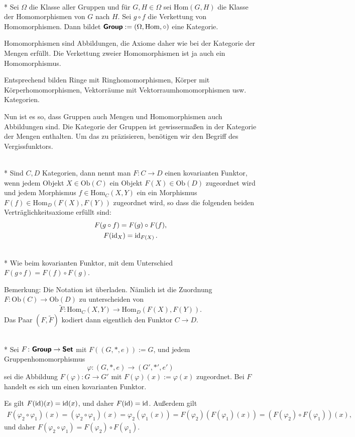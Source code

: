 \begin{Satz}\mbox{}\\*
Sei $\Omega$ die Klasse aller Gruppen und für $G,H\in\Omega$ sei
$\mathrm{Hom}(G,H)$ die Klasse der Homomorphismen von $G$ nach $H$.
Sei $g\circ f$ die Verkettung von Homomorphismen.
Dann bildet $\textsf{\textbf{Group}}:=(\Omega,\mathrm{Hom},\circ)$
eine Kategorie.
\end{Satz}
 Homomorphismen sind Abbildungen, die Axiome
daher wie bei der Kategorie der Mengen erfüllt. Die Verkettung
zweier Homomorphismen ist ja auch ein Homomorphismus.\;\qedsymbol

Entsprechend bilden Ringe mit Ringhomomorphismen, Körper mit
Körperhomomorphismen, Vektorräume mit Vektorraumhomomorphismen
usw. Kategorien.

Nun ist es so, dass Gruppen auch Mengen und Homomorphismen
auch Abbildungen sind. Die Kategorie der Gruppen ist gewissermaßen
in der Kategorie der Mengen enthalten. Um das zu präzisieren,
benötigen wir den Begriff des Vergissfunktors.

\begin{Definition}\mbox{}\\*
Sind $C,D$ Kategorien, dann nennt man $F\colon C\to D$ einen
kovarianten Funktor, wenn jedem Objekt $X\in\mathrm{Ob}(C)$ ein Objekt
$F(X)\in\mathrm{Ob}(D)$ zugeordnet wird und jedem Morphismus
$f\in\mathrm{Hom}_C(X,Y)$ ein ein Morphismus
$F(f)\in\mathrm{Hom}_D(F(X),F(Y))$ zugeordnet wird,
so dass die folgenden beiden Verträglichkeitsaxiome erfüllt sind:%
\begin{gather*}
F(g\circ f) = F(g)\circ F(f),\\
F(\operatorname{id}_X) = \operatorname{id}_{F(X)}.
\end{gather*}
\end{Definition}
\begin{Definition}\mbox{}\\*
Wie beim kovarianten Funktor, mit dem Unterschied
$F(g\circ f) = F(f)\circ F(g)$.
\end{Definition}
Bemerkung: Die Notation ist überladen. Nämlich ist die Zuordnung
$F\colon\mathrm{Ob}(C)\to\mathrm{Ob}(D)$ zu unterscheiden
von
\[\tilde F\colon\mathrm{Hom}_C(X,Y)\to\mathrm{Hom}_D(F(X),F(Y)).\]
Das Paar $(F,\tilde F)$ kodiert dann eigentlich den Funktor
$C\to D$.

\begin{Satz}[Vergissfunktor]\mbox{}\\*
Sei $F\colon\textsf{\textbf{Group}}\to\textsf{\textbf{Set}}$ mit $F((G,*,e)):=G$,
und jedem Gruppenhomomorphismus%
\[\varphi\colon (G,*,e)\to (G',*',e')\]
sei die Abbildung $F(\varphi)\colon G\to G'$ mit
$F(\varphi)(x):=\varphi(x)$ zugeordnet. Bei $F$ handelt
es sich um einen kovarianten Funktor.
\end{Satz}
Es gilt $F(\operatorname{id})(x) = \operatorname{id}(x)$, und daher $F(\operatorname{id})=\operatorname{id}$.
Außerdem gilt%
\begin{gather*}
F(\varphi_2\circ\varphi_1)(x) = (\varphi_2\circ\varphi_1)(x)
= \varphi_2(\varphi_1(x))
= F(\varphi_2)(F(\varphi_1)(x))
= (F(\varphi_2)\circ F(\varphi_1))(x),
\end{gather*}
und daher $F(\varphi_2\circ\varphi_1)
= F(\varphi_2)\circ F(\varphi_1)$.\;\qedsymbol

